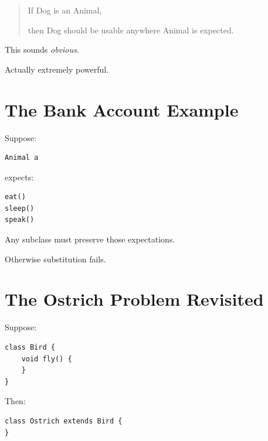 \documentclass[11pt,a4paper]{book}
\begin{document}
\begin{quote}

If Dog is an Animal,

then Dog should be usable anywhere
Animal is expected.

\end{quote}


This sounds \emph{obvious}.

Actually extremely powerful.


\section{The Bank Account Example}

Suppose:

\begin{verbatim}
Animal a
\end{verbatim}

expects:

\begin{verbatim}
eat()
sleep()
speak()
\end{verbatim}


Any subclass must preserve
those expectations.


Otherwise substitution fails.


\section{The Ostrich Problem Revisited}

Suppose:

\begin{verbatim}
class Bird {
    void fly() {
    }
}
\end{verbatim}


Then:

\begin{verbatim}
class Ostrich extends Bird {
}
\end{verbatim}
\end{document}
